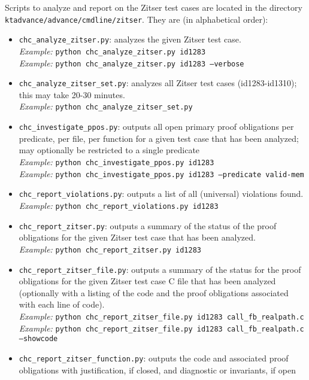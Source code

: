 \documentclass[11pt]{article}
\begin{document}
Scripts to analyze and report on the Zitser test cases are located in the
directory {\tt ktadvance/\-advance/\-cmdline/\-zitser}. They are (in alphabetical order):
\begin{itemize}[leftmargin=*]
\item {\tt chc\_analyze\_zitser.py}: analyzes the given Zitser test case.\\
\emph{Example:} {\tt python chc\_analyze\_zitser.py id1283} \\
\emph{Example:} {\tt python chc\_analyze\_zitser.py id1283 --verbose}
\item {\tt chc\_analyze\_zitser\_set.py}: analyzes all Zitser test cases (id1283-id1310);
  this may take 20-30 minutes. \\
\emph{Example:} {\tt python chc\_analyze\_zitser\_set.py}
\item {\tt chc\_investigate\_ppos.py}: outputs all open primary proof obligations per 
   predicate, per file, per function for a given test case that has been analyzed; 
   may optionally be restricted to a single predicate \\
\emph{Example:} {\tt python chc\_investigate\_ppos.py id1283} \\
\emph{Example:} {\tt python chc\_investigate\_ppos.py id1283 --predicate valid-mem}
\item {\tt chc\_report\_violations.py}: outputs a list of all (universal) violations
   found.\\
\emph{Example:} {\tt python chc\_report\_violations.py id1283}
\item {\tt chc\_report\_zitser.py}: outputs a summary of the status of the proof 
   obligations for the given Zitser test case that has been analyzed.\\
\emph{Example:} {\tt python chc\_report\_zitser.py id1283}
\item {\tt chc\_report\_zitser\_file.py}: outputs a summary of the status for the
  proof obligations for the given Zitser test case C file that has been analyzed
  (optionally with a listing of the code and the proof obligations associated with
  each line of code).\\
\emph{Example:} {\tt python chc\_report\_zitser\_file.py id1283 call\_fb\_realpath.c} \\
\emph{Example:} {\tt python chc\_report\_zitser\_file.py id1283 call\_fb\_realpath.c --showcode}
\item {\tt chc\_report\_zitser\_function.py}: outputs the code and associated proof
  obligations with justification, if closed, and diagnostic or invariants, if open

\end{itemize}
\end{document}
